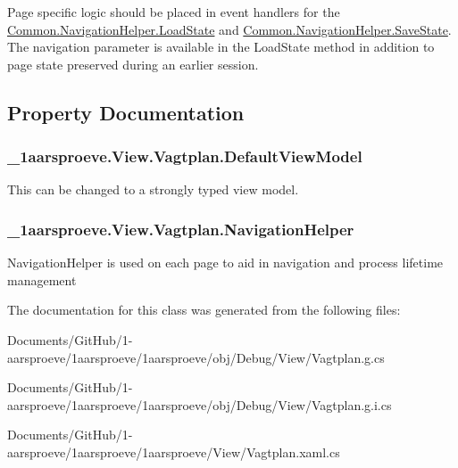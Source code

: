 Page specific logic should be placed in event handlers for the \hyperlink{class__1aarsproeve_1_1_common_1_1_navigation_helper_ab4abff9d3eb04794d05d43ff3846e344}{Common.\+Navigation\+Helper.\+Load\+State} and \hyperlink{class__1aarsproeve_1_1_common_1_1_navigation_helper_a627a89278c28e536b6e7fea11da6d465}{Common.\+Navigation\+Helper.\+Save\+State}. The navigation parameter is available in the Load\+State method in addition to page state preserved during an earlier session. 

\subsection{Property Documentation}
\hypertarget{class__1aarsproeve_1_1_view_1_1_vagtplan_aa886f262e9d0680645f45daa22bd473a}{}
\subsubsection[{Default\+View\+Model}]{ \+\_\+1aarsproeve.\+View.\+Vagtplan.\+Default\+View\+Model\hspace{0.3cm}{\ttfamily [get]}}\label{class__1aarsproeve_1_1_view_1_1_vagtplan_aa886f262e9d0680645f45daa22bd473a}


This can be changed to a strongly typed view model. 

\hypertarget{class__1aarsproeve_1_1_view_1_1_vagtplan_a8821ea381132cfc4259a782a59201134}{}
\subsubsection[{Navigation\+Helper}]{ \+\_\+1aarsproeve.\+View.\+Vagtplan.\+Navigation\+Helper\hspace{0.3cm}{\ttfamily [get]}}\label{class__1aarsproeve_1_1_view_1_1_vagtplan_a8821ea381132cfc4259a782a59201134}


Navigation\+Helper is used on each page to aid in navigation and process lifetime management 



The documentation for this class was generated from the following files\+:\begin{DoxyCompactItemize}
\item 
Documents/\+Git\+Hub/1-\/aarsproeve/1aarsproeve/1aarsproeve/obj/\+Debug/\+View/Vagtplan.\+g.\+cs\item 
Documents/\+Git\+Hub/1-\/aarsproeve/1aarsproeve/1aarsproeve/obj/\+Debug/\+View/Vagtplan.\+g.\+i.\+cs\item 
Documents/\+Git\+Hub/1-\/aarsproeve/1aarsproeve/1aarsproeve/\+View/Vagtplan.\+xaml.\+cs\end{DoxyCompactItemize}
